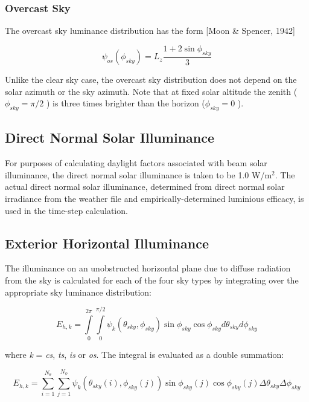 \subsubsection{Overcast Sky}\label{overcast-sky}

The overcast sky luminance distribution has the form {[}Moon \& Spencer, 1942{]}

\begin{equation}
{\psi_{os}}({\phi_{sky}}) = {L_z}\frac{{1 + 2\sin {\phi_{sky}}}}{3}
\end{equation}

Unlike the clear sky case, the overcast sky distribution does not depend on the solar azimuth or the sky azimuth. Note that at fixed solar altitude the zenith (\({\phi_{sky}} = \pi /2\) ) is three times brighter than the horizon (\({\phi_{sky}} = 0\) ).

\subsection{Direct Normal Solar Illuminance}\label{direct-normal-solar-illuminance}

For purposes of calculating daylight factors associated with beam solar illuminance, the direct normal solar illuminance is taken to be 1.0 W/m\(^{2}\). The actual direct normal solar illuminance, determined from direct normal solar irradiance from the weather file and empirically-determined luminious efficacy, is used in the time-step calculation.

\subsection{Exterior Horizontal Illuminance}\label{exterior-horizontal-illuminance}

The illuminance on an unobstructed horizontal plane due to diffuse radiation from the sky is calculated for each of the four sky types by integrating over the appropriate sky luminance distribution:

\begin{equation}
{E_{h,k}} = \int\limits_0^{2\pi } {\int\limits_0^{\pi /2} {{\psi_k}({\theta_{sky}},{\phi_{sky}})\sin {\phi_{sky}}\cos {\phi_{sky}}d{\theta_{sky}}} } d{\phi_{sky}}
\end{equation}

where \emph{k} = \emph{cs}, \emph{ts}, \emph{is} or \emph{os}. The integral is evaluated as a double summation:

\begin{equation}
{E_{h,k}} = \sum\limits_{i = 1}^{{N_\theta }} {\sum\limits_{j = 1}^{{N_\phi }} {{\psi_k}\left( {{\theta_{sky}}(i),{\phi_{sky}}(j)} \right)} } \sin {\phi_{sky}}(j)\cos {\phi_{sky}}(j)\Delta {\theta_{sky}}\Delta {\phi_{sky}}
\end{equation}

